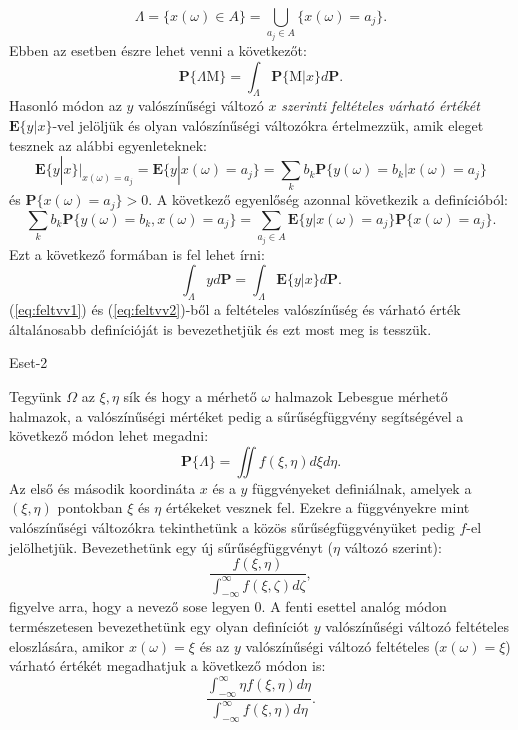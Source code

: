 \documentclass{article}
\begin{document}
\[
 \Lambda = \{x(\omega) \in A\} = \bigcup_{a_j \in A}\{x(\omega) = a_j\}.
\]
Ebben az esetben észre lehet venni a következőt:
\begin{equation}
 \mathbf{P}\{\Lambda \mathrm{M} \} = \int_{\Lambda} \mathbf{P}\{\mathrm{M}|x\} d\mathrm{\textbf{P}}.
	\label{eq:feltvv1}
\end{equation}
Hasonló módon az $y$ valószínűségi változó $x$ \textit{szerinti feltételes várható értékét} $\mathrm{\textbf{E}}\{y|x\}$-vel jelöljük és olyan valószínűségi változókra értelmezzük, amik eleget tesznek az alábbi egyenleteknek:
\[
	\mathrm{\textbf{E}}\{y|x\} {|}_{x(\omega) = a_j} = \mathrm{\textbf{E}}\{y|x(\omega) = a_j\} = \sum_{k} b_k \mathbf{P}\{y(\omega) =b_k | x(\omega) = a_j \} 
\]
és $\mathbf{P}\{x(\omega) = a_j\} > 0$. A következő egyenlőség azonnal következik a definícióból:
\[
 \sum_{k} b_k \mathbf{P}\{y(\omega) =b_k, x(\omega) = a_j \} = \sum_{a_j \in A} \mathrm{\textbf{E}}\{y | x(\omega) = a_j \} \mathbf{P}\{x(\omega) = a_j \}.
\]
Ezt a következő formában is fel lehet írni:
\begin{equation}
	\int_{\Lambda} y d\mathrm{\textbf{P}} = \int_{\Lambda} \mathrm{\textbf{E}}\{y|x\} d\mathrm{\textbf{P}}.
	\label{eq:feltvv2}
\end{equation}
(\ref{eq:feltvv1}) és (\ref{eq:feltvv2})-ből a feltételes valószínűség és várható érték általánosabb definícióját is bevezethetjük és ezt most meg is tesszük.
\begin{description}
	\item[Eset-2] 
\end{description}
Tegyünk $\Omega$ az $\xi,\eta$ sík és hogy a mérhető $\omega$ halmazok Lebesgue mérhető halmazok, a valószínűségi mértéket pedig a sűrűségfüggvény segítségével a következő módon lehet megadni:
\[
	\mathbf{P}\{\Lambda\}=\iint f(\xi,\eta) d \xi d \eta.
\]
Az első és második koordináta $x$ és a $y$ függvényeket definiálnak, amelyek a $(\xi,\eta)$ pontokban $\xi$ és $\eta$ értékeket vesznek fel. Ezekre a függvényekre mint valószínűségi változókra tekinthetünk a közös sűrűségfüggvényüket pedig $f$-el jelölhetjük. Bevezethetünk egy új sűrűségfüggvényt ($\eta$ változó szerint):
\[
 \frac{f(\xi,\eta)}{\int_{-\infty}^{\infty} f(\xi,\zeta) d \zeta},
\]
figyelve arra, hogy a nevező sose legyen $0$. A fenti esettel analóg módon természetesen bevezethetünk egy olyan definíciót $y$ valószínűségi változó feltételes eloszlására, amikor $x(\omega) = \xi$ és az $y$ valószínűségi változó feltételes ($x(\omega) = \xi$) várható értékét megadhatjuk a következő módon is:
\[
	\frac{\int_{-\infty}^{\infty}\eta f(\xi,\eta) d\eta}{\int_{-\infty}^{\infty} f(\xi,\eta) d\eta }.
\]
\end{document}
